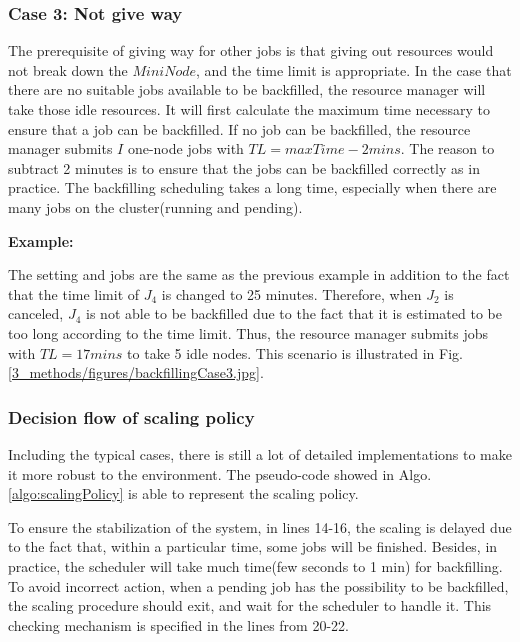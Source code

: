 \subsubsection{Case 3: Not give way}

The prerequisite of giving way for other jobs is that giving out resources would not break down the $MiniNode$, and the time limit is appropriate.
In the case that there are no suitable jobs available to be backfilled, the resource manager will take those idle resources.
It will first calculate the maximum time necessary to ensure that a job can be backfilled. If no job can be backfilled, the resource manager submits $I$ one-node jobs with $TL=maxTime-2mins$.
The reason to subtract 2 minutes is to ensure that the jobs can be backfilled correctly as in practice.
The backfilling scheduling takes a long time, especially when there are many jobs on the cluster(running and pending).

\textbf{Example:}

The setting and jobs are the same as the previous example in addition to the fact that the time limit of $J_{4}$ is changed to 25 minutes. 
Therefore, when $J_{2}$ is canceled, $J_{4}$ is not able to be backfilled due to the fact that it is estimated to be too long according to the time limit.
Thus, the resource manager submits jobs with $TL=17 mins$ to take 5 idle nodes. This scenario is illustrated in Fig. \ref{3_methods/figures/backfillingCase3.jpg}.


\subsubsection{Decision flow of scaling policy}

Including the typical cases, there is still a lot of detailed implementations to make it more robust to the environment. The pseudo-code showed in Algo. \ref{algo:scalingPolicy} is able to represent the scaling policy.

To ensure the stabilization of the system, in lines 14-16, the scaling is delayed due to the fact that, within a particular time, some jobs will be finished. 
Besides, in practice, the scheduler will take much time(few seconds to 1 min) for backfilling. 
To avoid incorrect action, when a pending job has the possibility to be backfilled, the scaling procedure should exit, and wait for the scheduler to handle it.
This checking mechanism is specified in the lines from 20-22.

